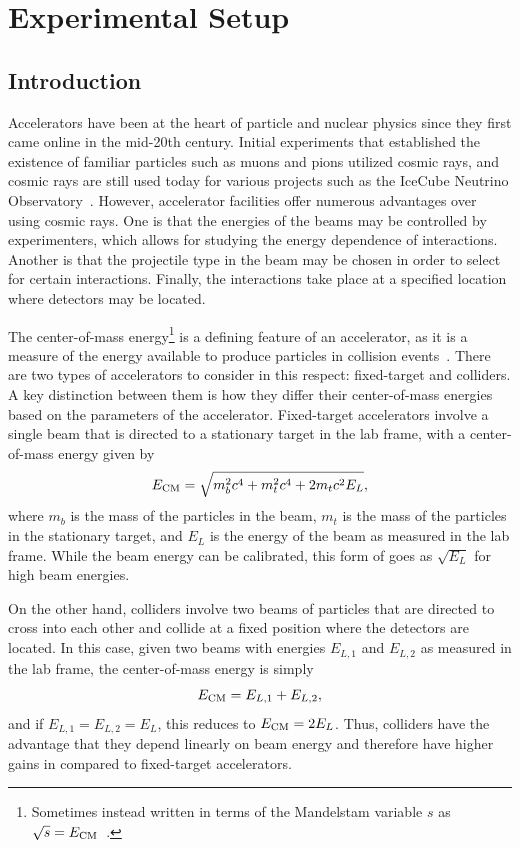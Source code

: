 
\chapter{Experimental Setup}
\label{chap:exp}

\section{Introduction}

Accelerators have been at the heart of particle and nuclear physics since they first came online in the mid-20th century.
Initial experiments that established the existence of familiar particles such as muons and pions utilized cosmic rays, and cosmic rays are still used today for various projects such as the IceCube Neutrino Observatory~\cite{Abbasi_2009}.
However, accelerator facilities offer numerous advantages over using cosmic rays.
One is that the energies of the beams may be controlled by experimenters, which allows for studying the energy dependence of interactions.
Another is that the projectile type in the beam may be chosen in order to select for certain interactions.
Finally, the interactions take place at a specified location where detectors may be located.

The center-of-mass energy\footnote{Sometimes instead written in terms of the Mandelstam variable $s$ as $\sqrt{s}=E_\mathrm{CM}$~\cite{Perelstein_2011}.} \ECM is a defining feature of an accelerator, as it is a measure of the energy available to produce particles in collision events~\cite{martin2008particle}.
There are two types of accelerators to consider in this respect: fixed-target and colliders.
A key distinction between them is how they differ their center-of-mass energies based on the parameters of the accelerator.
Fixed-target accelerators involve a single beam that is directed to a stationary target in the lab frame, with a center-of-mass energy given by
\begin{equation}
  E_\mathrm{CM}=\sqrt{m_b^2c^4+m_t^2c^4+2m_tc^2E_L},
\end{equation}
where $m_b$ is the mass of the particles in the beam, $m_t$ is the mass of the particles in the stationary target, and $E_L$ is the energy of the beam as measured in the lab frame.
While the beam energy can be calibrated, this form of \ECM goes as $\sqrt{E_L}$ for high beam energies.

On the other hand, colliders involve two beams of particles that are directed to cross into each other and collide at a fixed position where the detectors are located.
In this case, given two beams with energies $E_{L,1}$ and $E_{L,2}$ as measured in the lab frame, the center-of-mass energy is simply
\begin{equation}
  E_\mathrm{CM}=E_{L,1}+E_{L,2},
\end{equation}
and if $E_{L,1}=E_{L,2}=E_L$, this reduces to $E_\mathrm{CM}=2E_L$.
Thus, colliders have the advantage that they depend linearly on beam energy and therefore have higher gains in \ECM compared to fixed-target accelerators.

